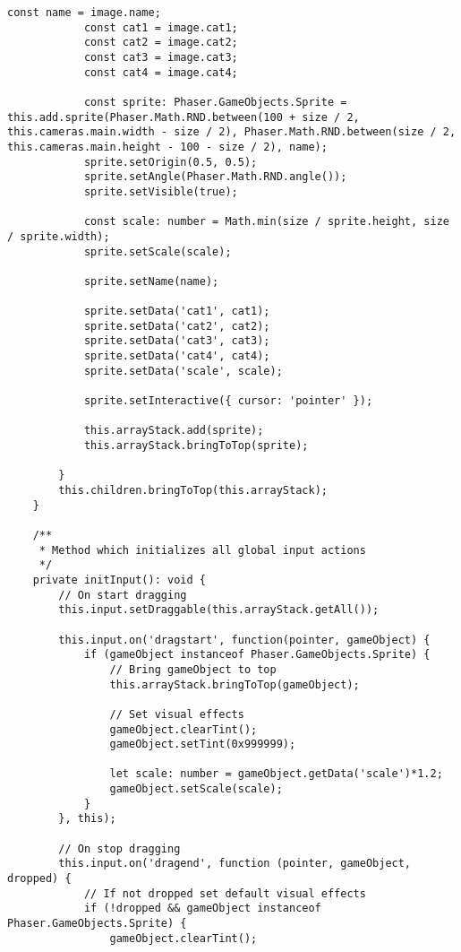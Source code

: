 \begin{lstlisting}[style=TypeScript, caption={sortingScene.ts}]
            const name = image.name;
            const cat1 = image.cat1;
            const cat2 = image.cat2;
            const cat3 = image.cat3;
            const cat4 = image.cat4;

            const sprite: Phaser.GameObjects.Sprite = this.add.sprite(Phaser.Math.RND.between(100 + size / 2, this.cameras.main.width - size / 2), Phaser.Math.RND.between(size / 2, this.cameras.main.height - 100 - size / 2), name);
            sprite.setOrigin(0.5, 0.5);
            sprite.setAngle(Phaser.Math.RND.angle());
            sprite.setVisible(true);

            const scale: number = Math.min(size / sprite.height, size / sprite.width);
            sprite.setScale(scale);

            sprite.setName(name);

            sprite.setData('cat1', cat1);
            sprite.setData('cat2', cat2);
            sprite.setData('cat3', cat3);
            sprite.setData('cat4', cat4);
            sprite.setData('scale', scale);

            sprite.setInteractive({ cursor: 'pointer' });

            this.arrayStack.add(sprite);
            this.arrayStack.bringToTop(sprite);

        }
        this.children.bringToTop(this.arrayStack);
    }

    /**
     * Method which initializes all global input actions
     */
    private initInput(): void {
        // On start dragging
        this.input.setDraggable(this.arrayStack.getAll());

        this.input.on('dragstart', function(pointer, gameObject) {
            if (gameObject instanceof Phaser.GameObjects.Sprite) {
                // Bring gameObject to top
                this.arrayStack.bringToTop(gameObject);

                // Set visual effects
                gameObject.clearTint();
                gameObject.setTint(0x999999);

                let scale: number = gameObject.getData('scale')*1.2;
                gameObject.setScale(scale);
            }
        }, this);

        // On stop dragging
        this.input.on('dragend', function (pointer, gameObject, dropped) {
            // If not dropped set default visual effects
            if (!dropped && gameObject instanceof Phaser.GameObjects.Sprite) {
                gameObject.clearTint();


\end{lstlisting}
